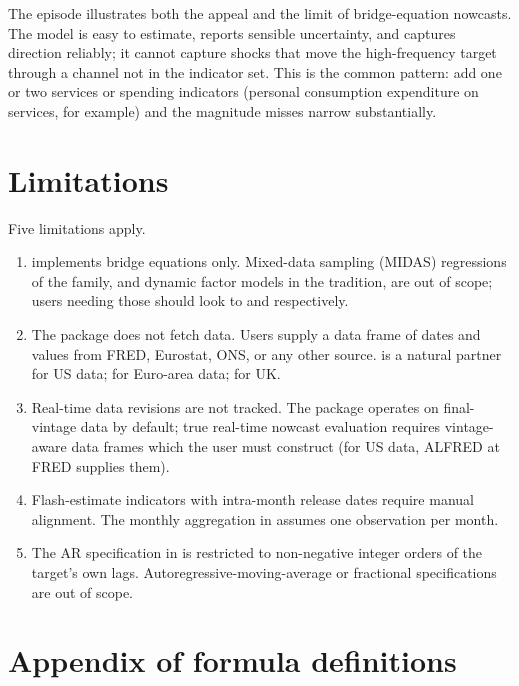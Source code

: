 The episode illustrates both the appeal and the limit of
bridge-equation nowcasts. The model is easy to estimate, reports
sensible uncertainty, and captures direction reliably; it cannot
capture shocks that move the high-frequency target through a
channel not in the indicator set. This is the common pattern: add
one or two services or spending indicators (personal consumption
expenditure on services, for example) and the magnitude misses
narrow substantially.

\section{Limitations}\label{limitations}

Five limitations apply.

\begin{enumerate}
\def\labelenumi{\arabic{enumi}.}
\tightlist
\item
   implements bridge equations only. Mixed-data
  sampling (MIDAS) regressions of the \citet{ghysels2004midas} family, and
  dynamic factor models in the \citet{giannone2008nowcasting} tradition,
  are out of scope; users needing those should look to
   and  respectively.
\item
  The package does not fetch data. Users supply a data frame of
  dates and values from FRED, Eurostat, ONS, or any other source.
   is a natural partner for US data;
   for Euro-area data;  for UK.
\item
  Real-time data revisions are not tracked. The package operates
  on final-vintage data by default; true real-time nowcast
  evaluation requires vintage-aware data frames which the user must
  construct (for US data, ALFRED at FRED supplies them).
\item
  Flash-estimate indicators with intra-month release dates require
  manual alignment. The monthly aggregation in 
  assumes one observation per month.
\item
  The AR specification in  is restricted to
  non-negative integer orders of the target's own lags.
  Autoregressive-moving-average or fractional specifications are
  out of scope.
\end{enumerate}

\section{Appendix of formula definitions}\label{appendix-of-formula-definitions}

